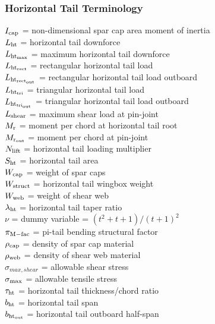 \subsubsection{Horizontal Tail Terminology}
\begin{tabbing}
$I_{\rm{cap}}$ = non-dimensional spar cap area moment of inertia \\
$L_{\rm{ht}}$ = horizontal tail downforce \\
$L_{\rm{ht}_{\rm{max}}}$ = maximum horizontal tail downforce \\
$L_{\rm{ht}_{rect}}$ = rectangular horizontal tail load \\
$L_{\rm{ht}_{\rm{rect}_{\rm{out}}}}$ = rectangular horizontal tail load outboard\\
$L_{\rm{ht}_{\rm{tri}}}$ = triangular horizontal tail load \\
$L_{\rm{ht}_{tri_{\rm{out}}}}$ = triangular horizontal tail load outboard\\
$L_{\rm{shear}}$ = maximum shear load at pin-joint\\
$M_{\rm{r}}$ = moment per chord at horizontal tail root \\
$M_{\rm{r}_{\rm{out}}}$ = moment per chord at pin-joint\\
$N_{\rm{lift}}$ = horizontal tail loading multiplier \\
$S_{\rm{ht}}$ = horizontal tail area \\
$W_{\rm{cap}}$ = weight of spar caps \\
$W_{\rm{struct}}$ = horizontal tail wingbox weight \\
$W_{\rm{web}}$ = weight of shear web \\
$\lambda_{\rm{ht}}$ = horizontal tail taper ratio \\
$\nu$ = dummy variable = $(t^2 + t + 1)/(t+1)^2$ \\
$\pi_{\rm{M-fac}}$ = pi-tail bending structural factor \\
$\rho_{\rm{cap}}$ = density of spar cap material \\
$\rho_{\rm{web}}$ = density of shear web material \\
$\sigma_{max,shear}$ = allowable shear stress \\
$\sigma_{\rm{max}}$ = allowable tensile stress \\
$\tau_{\rm{ht}}$ = horizontal tail thickness/chord ratio \\
$b_{\rm{ht}}$ = horizontal tail span \\
$b_{\rm{ht}_{\rm{out}}}$ = horizontal tail outboard half-span\\

\end{tabbing}
